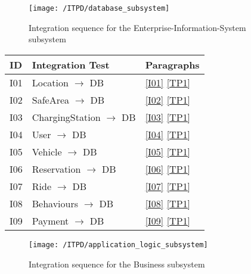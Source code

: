 	\begin{figure}[!ht]
	  \centering
	  \vspace{0.2cm}
	  \texttt{[image: /ITPD/database\_subsystem]}\\
	  \vspace{0.2cm}
	  \caption{Integration sequence for the Enterprise-Information-System subsystem} 
	  \label{fig:database_integration} 
	\end{figure}

	\begin{center}
		\vspace{0.6cm}
		\begin{tabular}{|l|l|l|}
			\hline
			\textbf{ID} & \textbf{Integration Test} & \textbf{Paragraphs} \bigstrut \\\hline
			\hline
			I01 & Location \ensuremath{\rightarrow} DB & \ref{I01}  \ref{TP1} \bigstrut \\\hline
			I02 & SafeArea \ensuremath{\rightarrow} DB & \ref{I02}  \ref{TP1} \bigstrut \\\hline
			I03 & ChargingStation \ensuremath{\rightarrow} DB & \ref{I03}  \ref{TP1} \bigstrut \\\hline
			I04 & User \ensuremath{\rightarrow} DB & \ref{I04}  \ref{TP1} \bigstrut \\\hline
			I05 & Vehicle \ensuremath{\rightarrow} DB & \ref{I05}  \ref{TP1} \bigstrut \\\hline
			I06 & Reservation \ensuremath{\rightarrow} DB & \ref{I06}  \ref{TP1} \bigstrut \\\hline
			I07 & Ride \ensuremath{\rightarrow} DB & \ref{I07}  \ref{TP1} \bigstrut \\\hline
			I08 & Behaviours \ensuremath{\rightarrow} DB & \ref{I08}  \ref{TP1} \bigstrut \\\hline
			I09 & Payment \ensuremath{\rightarrow} DB & \ref{I09}  \ref{TP1} \bigstrut \\\hline
		\end{tabular}
	\end{center}

	\newpage
	\begin{figure}[!ht]
	  \centering
	  \vspace{0.2cm}
	  \texttt{[image: /ITPD/application\_logic\_subsystem]}\\
	  \vspace{0.2cm}
	  \caption{Integration sequence for the Business subsystem} 
	  \label{fig:application_logic_subsystem} 
	\end{figure}

